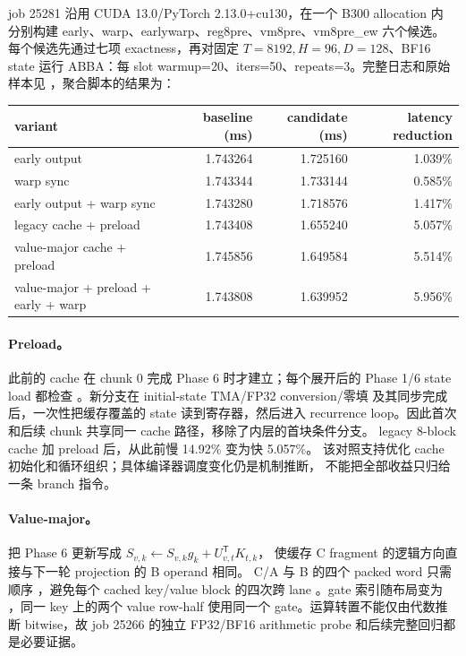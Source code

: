 job 25281 沿用 CUDA 13.0/PyTorch 2.13.0+cu130，在一个 B300 allocation 内
分别构建 early、warp、earlywarp、reg8pre、vm8pre、vm8pre\_ew 六个候选。
每个候选先通过七项 exactness，再对固定 \(T=8192,H=96,D=128\)、BF16 state
运行 ABBA：每 slot warmup=20、iters=50、repeats=3。完整日志和原始样本见
，聚合脚本的结果为：

\begin{center}\small
\begin{tabular}{@{}lrrr@{}}
\toprule
variant & baseline (ms) & candidate (ms) & latency reduction \\
\midrule
early output & 1.743264 & 1.725160 & 1.039\% \\
warp sync & 1.743344 & 1.733144 & 0.585\% \\
early output + warp sync & 1.743280 & 1.718576 & 1.417\% \\
legacy cache + preload & 1.743408 & 1.655240 & 5.057\% \\
value-major cache + preload & 1.745856 & 1.649584 & 5.514\% \\
value-major + preload + early + warp & 1.743808 & 1.639952 & 5.956\% \\
\bottomrule
\end{tabular}
\end{center}

\paragraph{Preload。}
此前的 cache 在 chunk 0 完成 Phase 6 时才建立；每个展开后的 Phase 1/6
state load 都检查 。新分支在 initial-state TMA/FP32 conversion/零填
及其同步完成后，一次性把缓存覆盖的 state 读到寄存器，然后进入 recurrence
loop。因此首次和后续 chunk 共享同一 cache 路径，移除了内层的首块条件分支。
legacy 8-block cache 加 preload 后，从此前慢 14.92\% 变为快 5.057\%。
该对照支持优化 cache 初始化和循环组织；具体编译器调度变化仍是机制推断，
不能把全部收益只归给一条 branch 指令。

\paragraph{Value-major。}
把 Phase 6 更新写成 \(S_{v,k}\leftarrow S_{v,k}g_k+U^\mathsf{T}_{v,t}K_{t,k}\)，
使缓存 C fragment 的逻辑方向直接与下一轮 projection 的 B operand 相同。
C/A 与 B 的四个 packed word 只需顺序 \code{[0,2,1,3]}，避免每个 cached
key/value block 的四次跨 lane 。gate 索引随布局变为
，同一 key 上的两个 value row-half
使用同一个 gate。运算转置不能仅由代数推断 bitwise，故 job 25266 的独立
FP32/BF16 arithmetic probe 和后续完整回归都是必要证据。

